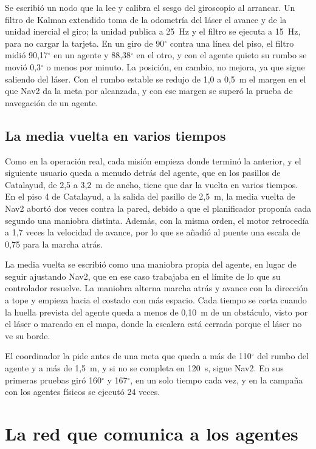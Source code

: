 Se escribió un nodo que la lee y calibra el sesgo del giroscopio al arrancar. Un filtro de Kalman extendido toma de la odometría del láser el avance y de la unidad inercial el giro; la unidad
publica a 25~Hz y el filtro se ejecuta a 15~Hz, para no cargar la tarjeta. En un giro de 90$^\circ$ contra una línea del piso, el filtro midió 90,17$^\circ$ en un agente y 88,38$^\circ$ en el otro, y
con el agente quieto su rumbo se movió 0,3$^\circ$ o menos por minuto. La posición, en cambio, no mejora, ya que sigue saliendo del láser. Con el rumbo estable se redujo de 1,0 a 0,5~m el margen en
el que Nav2 da la meta por alcanzada, y con ese margen se superó la prueba de navegación de un agente.

\subsection{La media vuelta en varios tiempos}
\label{sec:media-vuelta}

Como en la operación real, cada misión empieza donde terminó la anterior, y el siguiente usuario queda a menudo detrás del agente, que en los pasillos de Catalayud, de 2,5 a 3,2~m de ancho, tiene que dar la vuelta en varios
tiempos. En el piso 4 de Catalayud, a la salida del pasillo de 2,5~m, la media vuelta de Nav2 abortó dos veces contra la pared, debido a que el planificador proponía cada segundo una maniobra distinta. Además, con la misma
orden, el motor retrocedía a 1,7 veces la velocidad de avance, por lo que se añadió al puente una escala de 0,75 para la marcha atrás.

La media vuelta se escribió como una maniobra propia del agente, en lugar de seguir ajustando Nav2, que en ese caso trabajaba en el límite de lo que su controlador resuelve. La maniobra alterna marcha atrás y
avance con la dirección a tope y empieza hacia el costado con más espacio. Cada tiempo se corta cuando la huella prevista del agente queda a menos de 0,10~m de un obstáculo, visto por el láser o marcado en el
mapa, donde la escalera está cerrada porque el láser no ve su borde.

El coordinador la pide antes de una meta que queda a más de 110$^\circ$ del rumbo del agente y a más de 1,5~m, y si no se completa en 120~s, sigue Nav2. En sus primeras pruebas giró 160$^\circ$ y 167$^\circ$,
en un solo tiempo cada vez, y en la campaña con los agentes físicos se ejecutó 24 veces.

\section{La red que comunica a los agentes}
\label{sec:dos-vehiculos}
\label{sec:red}

